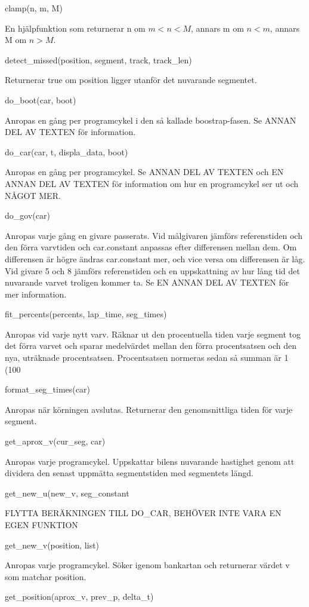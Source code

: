 \documentclass[10pt,oneside,swedish]{lips-no_customer}
\begin{document}
clamp(n, m, M)

En hjälpfunktion som returnerar n om $m < n < M$, annars m om $n < m$, annars M
om $n > M$.

detect\_missed(position, segment, track, track\_len)

Returnerar true om position ligger utanför det nuvarande segmentet.

do\_boot(car, boot)

Anropas en gång per programcykel i den så kallade boostrap-fasen. Se ANNAN DEL
AV TEXTEN för information.

do\_car(car, t, displa\_data, boot)

Anropas en gång per programcykel. Se ANNAN DEL AV TEXTEN och EN ANNAN DEL
AV TEXTEN för information om hur en programcykel ser ut och NÅGOT MER.

do\_gov(car)

Anropas varje gång en givare passerats. Vid målgivaren jämförs referenstiden och
den förra varvtiden och car.constant anpassas efter differensen mellan dem. Om
differensen är högre ändras car.constant mer, och vice versa om differensen är
låg. Vid givare 5 och 8 jämförs referenstiden och en uppskattning av hur lång
tid det nuvarande varvet troligen kommer ta. Se EN ANNAN DEL AV TEXTEN för
mer information.

fit\_percents(percents, lap\_time, seg\_times)

Anropas vid varje nytt varv. Räknar ut den procentuella tiden varje segment tog
det förra varvet och sparar medelvärdet mellan den förra procentsatsen och den
nya, uträknade procentsatsen. Procentsatsen normeras sedan så summan är 1
(100%

format\_seg\_times(car)

Anropas när körningen avslutas. Returnerar den genomsnittliga tiden för varje
segment.

get\_aprox\_v(cur\_seg, car)

Anropas varje programcykel. Uppskattar bilens nuvarande hastighet genom att
dividera den senast uppmätta segmentstiden med segmentets längd.

get\_new\_u(new\_v, seg\_constant

FLYTTA BERÄKNINGEN TILL DO\_CAR, BEHÖVER INTE VARA EN EGEN FUNKTION

get\_new\_v(position, list)

Anropas varje programcykel. Söker igenom bankartan och returnerar värdet v som
matchar position.

get\_position(aprox\_v, prev\_p, delta\_t)
\end{document}
